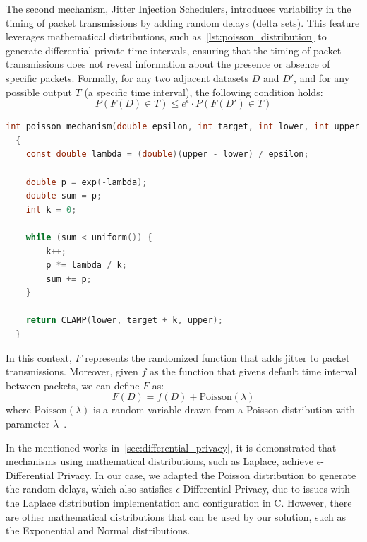 The second mechanism, Jitter Injection Schedulers, introduces variability in the timing of packet transmissions by adding random delays (delta sets). This feature leverages mathematical distributions, such as~\autoref{lst:poisson_distribution} to generate differential private time intervals, ensuring that the timing of packet transmissions does not reveal information about the presence or absence of specific packets. Formally, for any two adjacent datasets $D$ and $D'$, and for any possible output $T$ (a specific time interval), the following condition holds:
\[P(F(D) \in T) \leq e^{\epsilon} \cdot P(F(D') \in T)\]

\begin{lstlisting}[language=C, caption={Poisson Distribution Pseudo-Random Number Generator implementation.}, label={lst:poisson_distribution}]
  int poisson_mechanism(double epsilon, int target, int lower, int upper)
  {
    const double lambda = (double)(upper - lower) / epsilon;

    double p = exp(-lambda);
    double sum = p;
    int k = 0;

    while (sum < uniform()) {
        k++;
        p *= lambda / k;
        sum += p;
    }

    return CLAMP(lower, target + k, upper);
  }
\end{lstlisting}

In this context, $F$ represents the randomized function that adds jitter to packet transmissions. Moreover, given $f$ as the function that givens default time interval between packets, we can define $F$ as:
\[F(D) = f(D) + \text{Poisson}(\lambda)\]
where $\text{Poisson}(\lambda)$ is a random variable drawn from a Poisson distribution with parameter $\lambda$~\cite{DP_Book, AlgFoundationsDP}. 



In the mentioned works in~\autoref{sec:differential_privacy}, it is demonstrated that mechanisms using mathematical distributions, such as Laplace, achieve $\epsilon$-Differential Privacy. In our case, we adapted the Poisson distribution to generate the random delays, which also satisfies $\epsilon$-Differential Privacy, due to issues with the Laplace distribution implementation and configuration in C. However, there are other mathematical distributions that can be used by our solution, such as the Exponential and Normal distributions.

